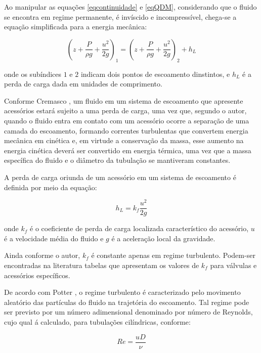 Ao manipular as equações \eqref{eqcontinuidade} e 
\eqref{eqQDM}, considerando que o fluido se encontra em
regime permanente, é invíscido e incompressível, chega-se a
equação simplificada para a energia mecânica:

\begin{equation}\label{eqBern}
    \left(
        z + \frac{P}{\rho g} + \frac{u^2}{2g}
    \right)_{1}
    =
    \left(
        z + \frac{P}{\rho g} + \frac{u^2}{2g}
    \right)_{2} + h_L
\end{equation}

onde os subíndices $1$ e $2$ indicam dois pontos de escoamento dinstintos, e $h_L$ é
a perda de carga dada em unidades de comprimento.

Conforme Cremasco \cite{Cremasco14}, um fluido em um sistema de 
escoamento que apresente 
acessórios estará sujeito a uma perda de
carga, uma vez que, segundo o autor, quando o fluido entra em contato com 
um acessório ocorre a separação de uma camada
do escoamento, formando correntes turbulentas que convertem energia mecânica 
em cinética e, em virtude a conservação da
massa, esse aumento na energia cinética deverá ser convertido em energia 
térmica, uma vez que a massa específica do
fluido e o diâmetro da tubulação se mantiveram constantes.

A perda de carga oriunda de um acessório em um sistema de escoamento é definida por meio da equação:

\begin{equation}
    h_L = k_f \frac{u^2}{2g}
\end{equation}

onde $k_f$ é o coeficiente de perda de carga localizada característico do acessório, 
$u$ é a velocidade média do fluido e $g$ é a aceleração local da gravidade. 

Ainda conforme o autor, $k_f$ é constante apenas em regime turbulento. Podem-ser 
encontradas na literatura tabelas que apresentam os valores de $k_f$ para válvulas
e acessórios específicos.


De acordo com Potter \cite{Potter15}, o regime turbulento é caracterizado 
pelo movimento
aleatório das partículas do fluido na
trajetória do escoamento. Tal regime pode ser previsto por um número 
adimensional denominado por número de Reynolds,
cujo qual á calculado, para tubulações cilíndricas, conforme:

\begin{equation}
    Re = \frac{u D}{\nu}
\end{equation}
 
